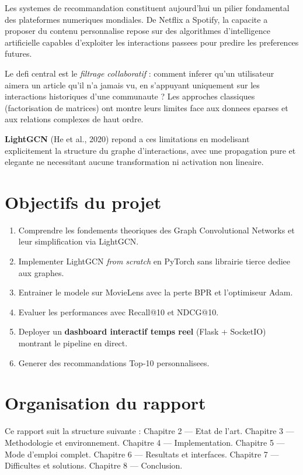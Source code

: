 \documentclass[12pt,a4paper]{report}
\begin{document}
Les systemes de recommandation constituent aujourd'hui un pilier
fondamental des plateformes numeriques mondiales. De Netflix a Spotify,
la capacite a proposer du contenu personnalise repose sur des
algorithmes d'intelligence artificielle capables d'exploiter les
interactions passees pour predire les preferences futures.

Le defi central est le \textit{filtrage collaboratif} : comment
inferer qu'un utilisateur aimera un article qu'il n'a jamais vu, en
s'appuyant uniquement sur les interactions historiques d'une
communaute ? Les approches classiques (factorisation de matrices) ont
montre leurs limites face aux donnees eparses et aux relations
complexes de haut ordre.

\textbf{LightGCN} (He et al., 2020) repond a ces limitations en
modelisant explicitement la structure du graphe d'interactions, avec
une propagation pure et elegante ne necessitant aucune transformation
ni activation non lineaire.

\section{Objectifs du projet}

\begin{enumerate}[label=\textbf{\arabic*.}]
  \item Comprendre les fondements theoriques des Graph Convolutional
    Networks et leur simplification via LightGCN.
  \item Implementer LightGCN \textit{from scratch} en PyTorch sans
    librairie tierce dediee aux graphes.
  \item Entrainer le modele sur MovieLens avec la perte BPR et
    l'optimiseur Adam.
  \item Evaluer les performances avec Recall@10 et NDCG@10.
  \item Deployer un \textbf{dashboard interactif temps reel}
    (Flask + SocketIO) montrant le pipeline en direct.
  \item Generer des recommandations Top-10 personnalisees.
\end{enumerate}

\section{Organisation du rapport}

Ce rapport suit la structure suivante : Chapitre 2 --- Etat de l'art.
Chapitre 3 --- Methodologie et environnement. Chapitre 4 ---
Implementation. Chapitre 5 --- Mode d'emploi complet. Chapitre 6 ---
Resultats et interfaces. Chapitre 7 --- Difficultes et solutions.
Chapitre 8 --- Conclusion.
\end{document}
